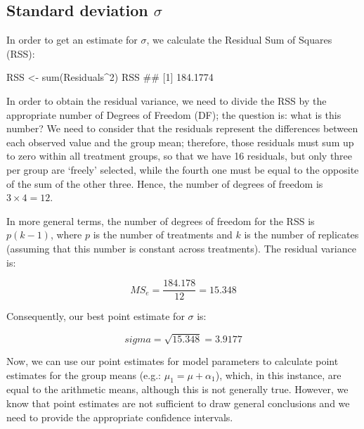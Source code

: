 \documentclass[a4paper,12pt,oneside]{book}
\newenvironment{Shaded}{\begin{snugshade}}{\end{snugshade}}
\newcommand{\DecValTok}[1]{#1}
\newcommand{\SpecialCharTok}[1]{#1}
\newcommand{\DocumentationTok}[1]{#1}
\newcommand{\OtherTok}[1]{#1}
\newcommand{\FunctionTok}[1]{#1}
\newcommand{\NormalTok}[1]{#1}
\begin{document}
\hypertarget{standard-deviation-sigma}{%
\subsection{\texorpdfstring{Standard deviation \(\sigma\)}{Standard deviation \textbackslash sigma}}\label{standard-deviation-sigma}}

In order to get an estimate for \(\sigma\), we calculate the Residual Sum of Squares (RSS):

\vspace{12pt}

\begin{Shaded}
\begin{Highlighting}[]
\NormalTok{RSS }\OtherTok{\textless{}{-}} \FunctionTok{sum}\NormalTok{(Residuals}\SpecialCharTok{\^{}}\DecValTok{2}\NormalTok{)}
\NormalTok{RSS}
\DocumentationTok{\#\# [1] 184.1774}
\end{Highlighting}
\end{Shaded}

In order to obtain the residual variance, we need to divide the RSS by the appropriate number of Degrees of Freedom (DF); the question is: what is this number? We need to consider that the residuals represent the differences between each observed value and the group mean; therefore, those residuals must sum up to zero within all treatment groups, so that we have 16 residuals, but only three per group are `freely' selected, while the fourth one must be equal to the opposite of the sum of the other three. Hence, the number of degrees of freedom is \(3 \times 4 = 12\).

In more general terms, the number of degrees of freedom for the RSS is \(p (k -1)\), where \(p\) is the number of treatments and \(k\) is the number of replicates (assuming that this number is constant across treatments). The residual variance is:

\[MS_{e}  = \frac{184.178}{12} = 15.348\]

Consequently, our best point estimate for \(\sigma\) is:

\[sigma =  \sqrt{15.348} = 3.9177\]

Now, we can use our point estimates for model parameters to calculate point estimates for the group means (e.g.: \(\mu_1 = \mu + \alpha_1\)), which, in this instance, are equal to the arithmetic means, although this is not generally true. However, we know that point estimates are not sufficient to draw general conclusions and we need to provide the appropriate confidence intervals.
\end{document}
